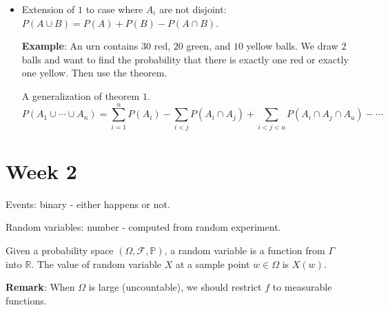 \documentclass{report}
\begin{document}
\begin{itemize}
        \item Extension of $1$ to case where $A_{i}$ are not disjoint: $P(A \cup B) = P(A) + P(B) - P(A \cap B)$. 

        \textbf{Example}: An urn contains $30$ red, $20$ green, and $10$ yellow balls. We draw $2$ balls and want to find the probability that there is exactly one red or exactly one yellow. Then use the theorem.

        A generalization of theorem $1$. 
            \begin{equation*}
                P(A_{1} \cup \cdots \cup A_{n}) = \sum_{i = 1}^{n}P(A_{i}) - \sum_{i < j}P(A_{i} \cap A_{j}) + \sum_{i < j < u} P(A_{i} \cap A_{j} \cap A_{u}) - \cdots
            \end{equation*}
    \end{itemize}

\chapter{Week 2}

Events: binary - either happens or not.

Random variables: number - computed from random experiment.

\begin{definition}{}
    Given a probability space $(\Omega, \mathcal{F}, \mathbb{P})$, a random variable is a function from $\Gamma$ into $\mathbb{R}$. The value of random variable $X$ at a sample point $w \in \Omega$ is $X(w)$.
\end{definition}

\textbf{Remark}: When $\Omega$ is large (uncountable), we should restrict $f$ to measurable functions.
\end{document}
